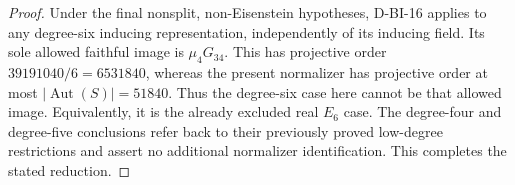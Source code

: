 \begin{proof}
Under the final nonsplit, non-Eisenstein hypotheses, D-BI-16
applies to any degree-six inducing representation, independently
of its inducing field.  Its sole allowed faithful image is
$\mu_4G_{34}$.  This has projective order
$39191040/6=6531840$, whereas the present normalizer has
projective order at most $|\operatorname{Aut}(S)|=51840$.
Thus the degree-six case here cannot be that allowed image.
Equivalently, it is the already excluded real $E_6$ case.
The degree-four and degree-five conclusions refer back to
their previously proved low-degree restrictions and assert no
additional normalizer identification.  This completes the
stated reduction.
\end{proof}
